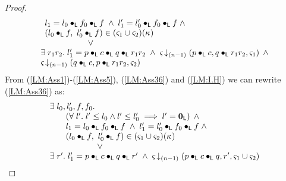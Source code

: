 \begin{lemma}[]
\begin{proof}
\begin{align}
\begin{array}{l}
\begin{array}{l}
	  	l_1 = l_0 \composeL f_0 \composeL f \;\land\; l'_1 = l'_0 \composeL f_0 \composeL f  \;\land\\
	  	(l_0 \composeL f,\ l'_0 \composeL f) \in (\amod{1} \cup \amod{2})(\ca{}) 
	  \end{array} \\
%
		\hspace*{2cm}\lor  \\
		\exsts{r_1r_2} l'_1 = p \composeL c \composeL q \composeL r_1r_2 \;\land\; \extendsAMUpto{\amod}{(n-1)}{p \composeL c}{q \composeL r_1r_2}{\amod{1}} \;\land\\
%
		\extendsAMUpto{\amod}{(n-1)}{q \composeL c}{p \composeL r_1r_2}{\amod{2}}
	\end{array} \label{LM:Ass36}
\end{align}
From (\ref{LM:Ass1})-(\ref{LM:Ass5}), (\ref{LM:Ass36}) and (\ref{LM:I.H}) we can rewrite (\ref{LM:Ass36}) as:
%
\begin{align}
	\begin{array}{l}
		\exsts{l_0, l'_0, f, f_0} \\
	  \hspace*{0.5cm}
	  \begin{array}{l}
	  	\left(\for{l'} l' \leq l_0 \land l' \leq l'_0 \implies l' = \unitL\right)\;\land\\
	  	l_1 = l_0 \composeL f_0 \composeL f \;\land\; l'_1 = l'_0 \composeL f_0 \composeL f  \;\land\\
	  	(l_0 \composeL f,\ l'_0 \composeL f) \in (\amod{1} \cup \amod{2})(\ca{}) 
	  \end{array} \\
%
		\hspace*{2cm}\lor  \\
		\exsts{r'} l'_1 = p \composeL c \composeL q \composeL r' \;\land\; \extendsAMUpto{\amod}{(n-1)}{p \composeL c \composeL q}{r'}{\amod{1} \cup \amod{2}}
	\end{array} \label{LM:Ass37}
\end{align}
%
%
%
%
%


\end{proof}
\end{lemma}
